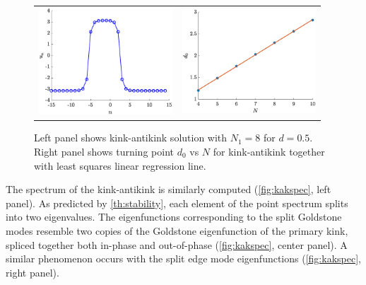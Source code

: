 \documentclass[12pt,reqno]{amsart}
\begin{document}
\begin{figure}[H]
	\begin{center}
	\begin{tabular}{cc}
	\includegraphics[width=5cm]{2kink.eps} &
	\includegraphics[width=5cm]{kakd0vsN.eps}
	\end{tabular}
	\end{center}
	\caption{Left panel shows kink-antikink solution with $N_1 = 8$ for $d = 0.5$. Right panel shows turning point $d_0$ vs $N$ for kink-antikink together with least squares linear regression line.}
	\label{fig:kak}
\end{figure}

The spectrum of the kink-antikink is similarly computed (\cref{fig:kakspec}, left panel). As predicted by \cref{th:stability}, each element of the point spectrum splits into two eigenvalues. The eigenfunctions corresponding to the split Goldstone modes resemble two copies of the Goldstone eigenfunction of the primary kink, spliced together both in-phase and out-of-phase (\cref{fig:kakspec}, center panel). A similar phenomenon occurs with the split edge mode eigenfunctions (\cref{fig:kakspec}, right panel).
\end{document}
